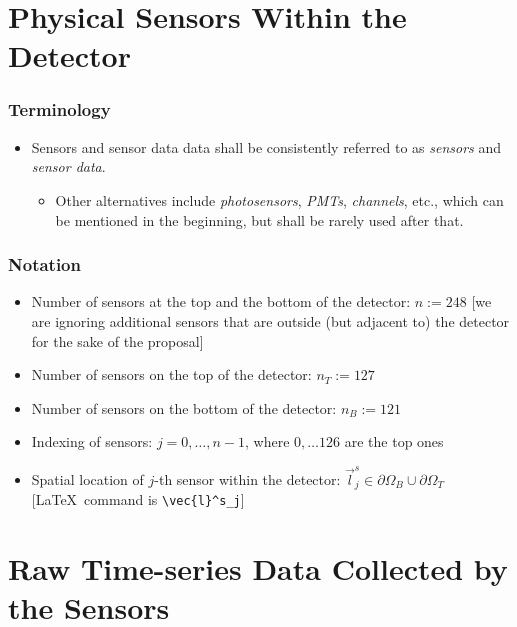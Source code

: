 \documentclass[]{article}
\providecommand{\tightlist}{%
  \setlength{\itemsep}{0pt}\setlength{\parskip}{0pt}}
\begin{document}
\section{Physical Sensors Within the Detector}

\subsubsection{Terminology}

\begin{itemize}
\tightlist
\item
  Sensors and sensor data data shall be consistently referred to as \emph{sensors} and \emph{sensor data}.

  \begin{itemize}
  \tightlist
  \item
    Other alternatives include \emph{photosensors}, \emph{PMTs}, \emph{channels}, etc., which can be mentioned in the beginning, but shall be rarely used after that.
  \end{itemize}
\end{itemize}

\subsubsection{Notation}

\begin{itemize}
\tightlist
\item
  Number of sensors at the top and the bottom of the detector:
  \(n := 248\)
  {[}we are ignoring additional sensors that are outside (but adjacent to) the detector for the sake of the proposal{]}
\item
  Number of sensors on the top of the detector: \(n_T := 127\)
\item
  Number of sensors on the bottom of the detector: \(n_B := 121\)
\item
  Indexing of sensors: \(j = 0,\dots,n-1\), where \(0, \dots 126\) are the top ones
\item
  Spatial location of \(j\)-th sensor within the detector:
  \(\vec{l}^s_j \in \partial\Omega_B \cup \partial\Omega_T\) {[}{\color{blue}\LaTeX~command is \verb|\vec{l}^s_j|}{]}
\end{itemize}


\section{Raw Time-series Data Collected by the Sensors}
\end{document}
